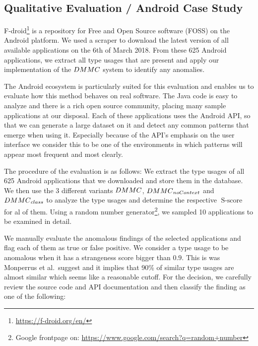 \subsection{Qualitative Evaluation / Android Case Study}

F-droid\footnote{\url{https://f-droid.org/en/}} is a repository for Free and Open Source software (FOSS) on the Android platform.
We used a scraper to download the latest version of all available applications on the 6th of March 2018.
From these 625 Android applications, we extract all type usages that are present and apply our implementation of the $\mathnormal{DMMC}$ system to identify any anomalies.

The Android ecosystem is particularly suited for this evaluation and enables us to evaluate how this method behaves on real software.
The Java code is easy to analyze and there is a rich open source community, placing many sample applications at our disposal.
Each of these applications uses the Android API, so that we can generate a large dataset on it and detect any common patterns that emerge when using it.
Especially because of the API's emphasis on the user interface we consider this to be one of the environments in which patterns will appear most frequent and most clearly.

The procedure of the evaluation is as follows:
We extract the type usages of all 625 Android applications that we downloaded and store them in the database.
We then use the 3 different variants $\mathnormal{DMMC}$, $\mathnormal{DMMC}_{\mathnormal{noContext}}$ and $\mathnormal{DMMC}_{\mathnormal{class}}$ to analyze the type usages and determine the respective $\operatorname{S-score}$ for al of them.
Using a random number generator\footnote{Google frontpage on: \url{https://www.google.com/search?q=random+number}}, we sampled 10 applications to be examined in detail.

We manually evaluate the anomalous findings of the selected applications and flag each of them as true or false positive.
We consider a type usage to be anomalous when it has a strangeness score bigger than $0.9$.
This is was Monperrus et al.\ suggest and it implies that 90\% of similar type usages are almost similar which seems like a reasonable cutoff.
For the decision, we carefully review the source code and API documentation and then classify the finding as one of the following: 

